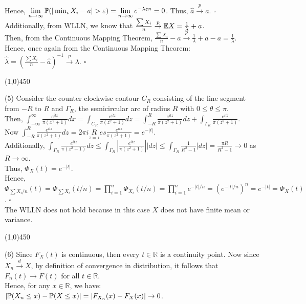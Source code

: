 \documentclass[12pt]{article}
\begin{document}
\noindent
Hence, $\lim\limits_{n\to\infty} \mathbb{P}(|\min_i X_i - a| > \varepsilon) = \lim\limits_{n\to\infty} e^{-\lambda\varepsilon n} = 0$. Thus, $\hat a \overset{p}\to a$. $\square$\\

\noindent
Additionally, from WLLN, we know that $\frac{\sum X_i}{n} \overset{p}\to \mathbb{E} X = \frac{1}{\lambda}+a$.\\
Then, from the Continuous Mapping Theorem, $\frac{\sum X_i}{n}-\hat a \overset{p}\to \frac{1}{\lambda} + a -a = \frac{1}{\lambda}.$\\
Hence, once again from the Continuous Mapping Theorem:\\
\indent $\hat \lambda = (\frac{\sum X_i}{n}-\hat a)^{-1} \overset{p}\to \lambda$. $\square$

\begin{center}
\line(1,0){450}
\end{center}

\noindent
(5) Consider the counter clockwise contour $C_R$ consisting of the line segment from $-R$ to $R$ and $\Gamma_R$, the semicircular arc of radius $R$ with $0 \leq \theta \leq\pi$.\\
Then, $\int_{-\infty}^\infty \frac{e^{itx}}{\pi(x^2+1)} dx = \int_{C_R} \frac{e^{itz}}{\pi(z^2+1)}dz=\int_{-R}^R \frac{e^{itz}}{\pi(z^2+1)}dz+\int_{\Gamma_R}\frac{e^{itz}}{\pi(z^2+1)}.$\\

\noindent
Now $\int_{-R}^R \frac{e^{itz}}{\pi(z^2+1)}dz = 2\pi i \underset{z=i} Res \frac{e^{itz}}{\pi(z^2+1)} = e^{-|t|}$.\\
Additionally, $\int_{\Gamma_R}\frac{e^{itz}}{\pi(z^2+1)} dz \leq \int_{\Gamma_R} |\frac{e^{itz}}{\pi(z^2+1)}| |dz|
\leq \int_{\Gamma_R} \frac{1}{R^2-1} |dz| = \frac{\pi R}{R^2-1} \to 0$ as $R\to\infty$. \\

\noindent
Thus,  $\Phi_X(t) = e^{-|t|}$. \\
Hence, $\Phi_{\sum X_i / n}(t) = \Phi_{\sum X_i} (t/n) = \prod\limits_{i=1}^n \Phi_{X_i}(t/n) = \prod_{i=1}^n e^{-|t|/n} = (e^{-|t|/n})^n = e^{-|t|} = \Phi_X(t)$. $\square$\\

\noindent
The WLLN does not hold because in this case $X$ does not have finite mean or variance.

\begin{center}
\line(1,0){450}
\end{center}

\noindent
(6) Since $F_X(t)$ is continuous, then every $t\in\mathbb{R}$ is a continuity point. Now since $X_n \overset{d}\to X$, by definition of convergence in distribution, it follows that $F_n(t) \to F(t)$ for all $t\in\mathbb{R}$.\\
Hence, for any $x\in\mathbb{R}$, we have:\\
\indent $|\mathbb{P}(X_n \leq x)-\mathbb{P}(X \leq x)| = |F_{X_n}(x)-F_X(x)| \to 0$.\\
\end{document}
